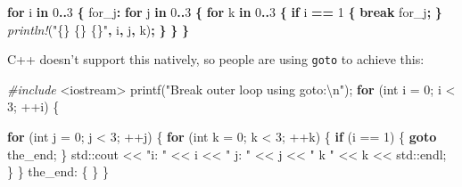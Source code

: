 \documentclass[
]{book}
\newenvironment{Shaded}{\begin{snugshade}}{\end{snugshade}}
\newcommand{\BuiltInTok}[1]{#1}
\newcommand{\ControlFlowTok}[1]{\textcolor[rgb]{0.13,0.29,0.53}{\textbf{#1}}}
\newcommand{\DataTypeTok}[1]{\textcolor[rgb]{0.13,0.29,0.53}{#1}}
\newcommand{\DecValTok}[1]{\textcolor[rgb]{0.00,0.00,0.81}{#1}}
\newcommand{\ImportTok}[1]{#1}
\newcommand{\KeywordTok}[1]{\textcolor[rgb]{0.13,0.29,0.53}{\textbf{#1}}}
\newcommand{\NormalTok}[1]{#1}
\newcommand{\OperatorTok}[1]{\textcolor[rgb]{0.81,0.36,0.00}{\textbf{#1}}}
\newcommand{\OtherTok}[1]{\textcolor[rgb]{0.56,0.35,0.01}{#1}}
\newcommand{\PreprocessorTok}[1]{\textcolor[rgb]{0.56,0.35,0.01}{\textit{#1}}}
\newcommand{\SpecialCharTok}[1]{\textcolor[rgb]{0.00,0.00,0.00}{#1}}
\newcommand{\StringTok}[1]{\textcolor[rgb]{0.31,0.60,0.02}{#1}}
\begin{document}
\begin{Shaded}
\begin{Highlighting}[]
\KeywordTok{for}\NormalTok{ i }\KeywordTok{in} \DecValTok{0}\OperatorTok{..}\DecValTok{3} \OperatorTok{\{}
    \OtherTok{\textquotesingle{}for\_j}\OperatorTok{:} \KeywordTok{for}\NormalTok{ j }\KeywordTok{in} \DecValTok{0}\OperatorTok{..}\DecValTok{3} \OperatorTok{\{}
        \KeywordTok{for}\NormalTok{ k }\KeywordTok{in} \DecValTok{0}\OperatorTok{..}\DecValTok{3} \OperatorTok{\{}
            \KeywordTok{if}\NormalTok{ i }\OperatorTok{==} \DecValTok{1} \OperatorTok{\{}
                \KeywordTok{break} \OtherTok{\textquotesingle{}for\_j}\OperatorTok{;}
            \OperatorTok{\}}
            \PreprocessorTok{println!}\NormalTok{(}\StringTok{"\{\} \{\} \{\}"}\OperatorTok{,}\NormalTok{ i}\OperatorTok{,}\NormalTok{ j}\OperatorTok{,}\NormalTok{ k)}\OperatorTok{;}
        \OperatorTok{\}}
    \OperatorTok{\}}
\OperatorTok{\}}
\end{Highlighting}
\end{Shaded}

C++ doesn't support this natively, so people are using \texttt{goto} to achieve this:

\begin{Shaded}
\begin{Highlighting}[]
\PreprocessorTok{\#include }\ImportTok{\textless{}iostream\textgreater{}}
\NormalTok{printf(}\StringTok{"Break outer loop using goto:}\SpecialCharTok{\textbackslash{}n}\StringTok{"}\NormalTok{);}
\ControlFlowTok{for}\NormalTok{ (}\DataTypeTok{int}\NormalTok{ i = }\DecValTok{0}\NormalTok{; i \textless{} }\DecValTok{3}\NormalTok{; ++i)}
\NormalTok{\{}

    \ControlFlowTok{for}\NormalTok{ (}\DataTypeTok{int}\NormalTok{ j = }\DecValTok{0}\NormalTok{; j \textless{} }\DecValTok{3}\NormalTok{; ++j)}
\NormalTok{    \{}
        \ControlFlowTok{for}\NormalTok{ (}\DataTypeTok{int}\NormalTok{ k = }\DecValTok{0}\NormalTok{; k \textless{} }\DecValTok{3}\NormalTok{; ++k)}
\NormalTok{        \{}
            \ControlFlowTok{if}\NormalTok{ (i == }\DecValTok{1}\NormalTok{)}
\NormalTok{            \{}
                \ControlFlowTok{goto}\NormalTok{ the\_end;}
\NormalTok{            \}}
            \BuiltInTok{std::}\NormalTok{cout \textless{}\textless{} }\StringTok{"i: "}\NormalTok{ \textless{}\textless{} i \textless{}\textless{} }\StringTok{" j: "}\NormalTok{ \textless{}\textless{} j \textless{}\textless{} }\StringTok{" k "}\NormalTok{ \textless{}\textless{} k \textless{}\textless{} }\BuiltInTok{std::}\NormalTok{endl;}
\NormalTok{        \}}
\NormalTok{    \}}
\NormalTok{the\_end:}
\NormalTok{\{}
\NormalTok{\}}
\NormalTok{\}}
\end{Highlighting}
\end{Shaded}
\end{document}
